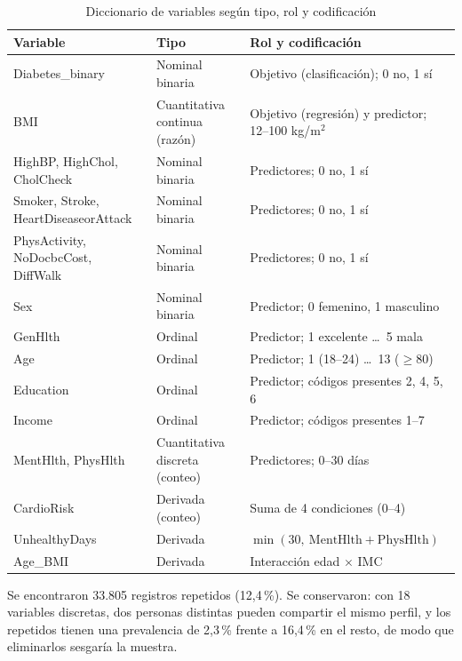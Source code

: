 \documentclass[conference,a4paper]{IEEEtran}
\begin{document}
\begin{table}[!t]
\centering
\caption{Diccionario de variables según tipo, rol y codificación}
\label{tab:variables}
\scriptsize
\setlength{\tabcolsep}{3pt}
\begin{tabularx}{\columnwidth}{@{}>{\raggedright\arraybackslash}p{2.35cm}>{\raggedright\arraybackslash}p{1.75cm}>{\raggedright\arraybackslash}X@{}}
\toprule
\textbf{Variable} & \textbf{Tipo} & \textbf{Rol y codificación} \\
\midrule
Diabetes\_binary & Nominal binaria & Objetivo (clasificación); 0 no, 1 sí \\
BMI & Cuantitativa continua (razón) & Objetivo (regresión) y predictor; 12--100 kg/m$^2$ \\
HighBP, HighChol, CholCheck & Nominal binaria & Predictores; 0 no, 1 sí \\
Smoker, Stroke, HeartDiseaseorAttack & Nominal binaria & Predictores; 0 no, 1 sí \\
PhysActivity, NoDocbcCost, DiffWalk & Nominal binaria & Predictores; 0 no, 1 sí \\
Sex & Nominal binaria & Predictor; 0 femenino, 1 masculino \\
GenHlth & Ordinal & Predictor; 1 excelente \ldots\ 5 mala \\
Age & Ordinal & Predictor; 1 (18--24) \ldots\ 13 ($\geq$80) \\
Education & Ordinal & Predictor; códigos presentes 2, 4, 5, 6 \\
Income & Ordinal & Predictor; códigos presentes 1--7 \\
MentHlth, PhysHlth & Cuantitativa discreta (conteo) & Predictores; 0--30 días \\
\midrule
CardioRisk & Derivada (conteo) & Suma de 4 condiciones (0--4) \\
UnhealthyDays & Derivada & $\min(30,\ \text{MentHlth}+\text{PhysHlth})$ \\
Age\_BMI & Derivada & Interacción edad $\times$ IMC \\
\bottomrule
\end{tabularx}
\end{table}

Se encontraron 33.805 registros repetidos (12,4\,\%). Se conservaron: con 18 variables discretas, dos personas distintas pueden compartir el mismo perfil, y los repetidos tienen una prevalencia de 2,3\,\% frente a 16,4\,\% en el resto, de modo que eliminarlos sesgaría la muestra.
\end{document}
